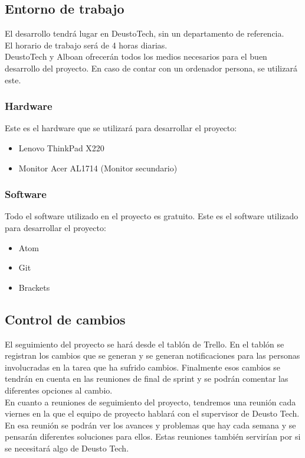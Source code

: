 \subsection{Entorno de trabajo}
El desarrollo tendrá lugar en DeustoTech, sin un departamento de referencia.\\

El horario de trabajo será de 4 horas diarias.\\

DeustoTech y Alboan ofrecerán todos los medios necesarios para el buen desarrollo del proyecto. En caso de contar con un ordenador persona, se utilizará este.

\subsubsection{Hardware}
Este es el hardware que se utilizará para desarrollar el proyecto:
\begin{itemize}
	\item Lenovo ThinkPad X220
	\item Monitor Acer AL1714 (Monitor secundario)
\end{itemize}

\subsubsection{Software}
Todo el software utilizado en el proyecto es gratuito. Este es el software utilizado para desarrollar el proyecto:
\begin{itemize}
	\item Atom
	\item Git
	\item Brackets
\end{itemize}

\subsection{Control de cambios}
El seguimiento del proyecto se hará desde el tablón de Trello. En el tablón se registran los cambios que se generan y se generan notificaciones para las personas involucradas en la tarea que ha sufrido cambios. Finalmente esos cambios se tendrán en cuenta en las reuniones de final de sprint y se podrán comentar las diferentes opciones al cambio.\\

En cuanto a reuniones de seguimiento del proyecto, tendremos una reunión cada viernes en la que el equipo de proyecto hablará con el supervisor de Deusto Tech. En esa reunión se podrán ver los avances y problemas que hay cada semana y se pensarán diferentes soluciones para ellos. Estas reuniones también servirían por si se necesitará algo de Deusto Tech.



